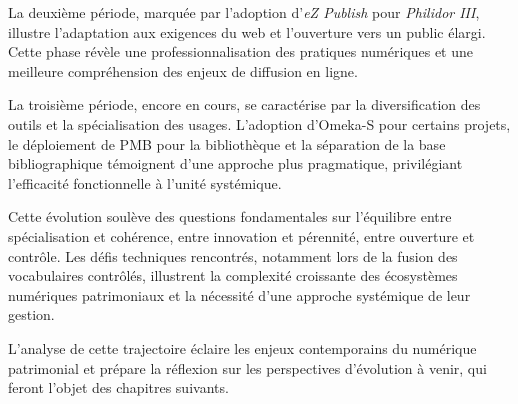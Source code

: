 La deuxième période, marquée par l'adoption d'\textit{eZ Publish} pour \textit{Philidor III}, illustre l'adaptation aux exigences du web et l'ouverture vers un public élargi. Cette phase révèle une professionnalisation des pratiques numériques et une meilleure compréhension des enjeux de diffusion en ligne.

La troisième période, encore en cours, se caractérise par la diversification des outils et la spécialisation des usages. L'adoption d'Omeka-S pour certains projets, le déploiement de PMB pour la bibliothèque et la séparation de la base bibliographique témoignent d'une approche plus pragmatique, privilégiant l'efficacité fonctionnelle à l'unité systémique.

Cette évolution soulève des questions fondamentales sur l'équilibre entre spécialisation et cohérence, entre innovation et pérennité, entre ouverture et contrôle. Les défis techniques rencontrés, notamment lors de la fusion des vocabulaires contrôlés, illustrent la complexité croissante des écosystèmes numériques patrimoniaux et la nécessité d'une approche systémique de leur gestion.

L'analyse de cette trajectoire éclaire les enjeux contemporains du numérique patrimonial et prépare la réflexion sur les perspectives d'évolution à venir, qui feront l'objet des chapitres suivants.